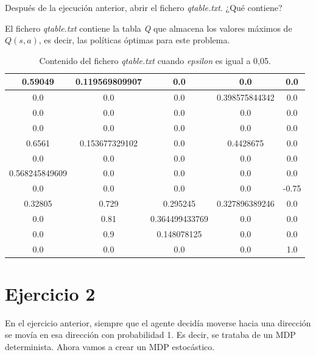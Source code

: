 \documentclass[11pt]{exam}
\begin{document}
\begin{questions}
{ \question Después de la ejecución anterior, abrir el fichero \textit{qtable.txt}. ¿Qué contiene?}

El fichero \textit{qtable.txt} contiene la tabla \textit{Q} que almacena los valores máximos de $Q(s,a)$, es decir, las políticas óptimas para este problema.

\begin{table}[h]
	\centering
	\begin{tabular}{|c|c|c|c|c|}
		\hline
		0.59049        & 0.119569809907 & 0.0            & 0.0            & 0.0   \\ \hline
		0.0            & 0.0            & 0.0            & 0.398575844342 & 0.0   \\ \hline
		0.0            & 0.0            & 0.0            & 0.0            & 0.0   \\ \hline
		0.0            & 0.0            & 0.0            & 0.0            & 0.0   \\ \hline
		0.6561         & 0.153677329102 & 0.0            & 0.4428675      & 0.0   \\ \hline
		0.0            & 0.0            & 0.0            & 0.0            & 0.0   \\ \hline
		0.568245849609 & 0.0            & 0.0            & 0.0            & 0.0   \\ \hline
		0.0            & 0.0            & 0.0            & 0.0            & -0.75 \\ \hline
		0.32805        & 0.729          & 0.295245       & 0.327896389246 & 0.0   \\ \hline
		0.0            & 0.81           & 0.364499433769 & 0.0            & 0.0   \\ \hline
		0.0            & 0.9            & 0.148078125    & 0.0            & 0.0   \\ \hline
		0.0            & 0.0            & 0.0            & 0.0            & 1.0   \\ \hline
	\end{tabular}
	\caption{Contenido del fichero \textit{qtable.txt} cuando \textit{epsilon} es igual a 0,05.}
	\label{table_2}
\end{table}

\end{questions}

\section*{Ejercicio 2}

En el ejercicio anterior, siempre que el agente decidía moverse hacia una dirección se movía en esa dirección con probabilidad 1. Es decir, se trataba de un MDP determinista. Ahora vamos a crear un MDP estocástico.
\end{document}
